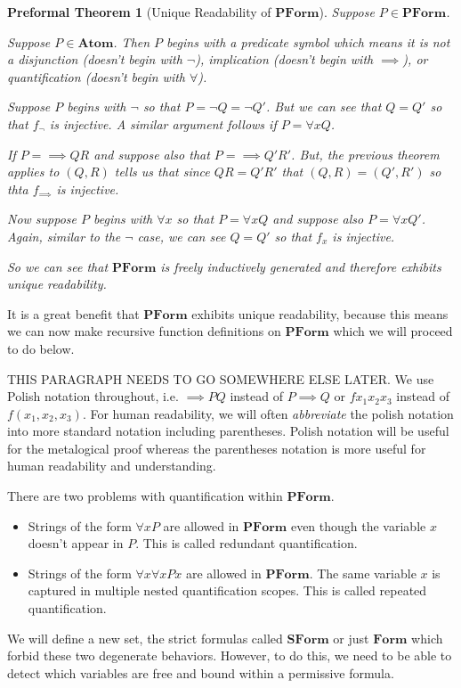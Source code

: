 \documentclass[oneside, 12pt]{book}
\theoremstyle{break}
\newtheorem{preformal definition}[definition]{Preformal Definition}
\newtheorem{preformal theorem}[theorem]{Preformal Theorem}
\begin{document}
		\begin{preformal theorem}[Unique Readability of $\textbf{PForm}$]
			Suppose $P\in \textbf{PForm}$.
			
			Suppose $P \in \textbf{Atom}$. Then $P$ begins with a predicate symbol which means it is not a disjunction (doesn't begin with $\lnot$), implication (doesn't begin with $\implies$), or quantification (doesn't begin with $\forall$).
			
			Suppose $P$ begins with $\lnot$ so that $P = \lnot Q = \lnot Q'$. 
			But we can see that $Q=Q'$ so that $f_{\lnot}$ is injective.
			A similar argument follows if $P = \forall x Q$.
			
			If $P = \implies QR$ and suppose also that $P = \implies Q'R'$.
			But, the previous theorem applies to $(Q, R)$ tells us that since $QR = Q'R'$ that $(Q, R) = (Q', R')$ so thta $f_{\implies}$ is injective.
			
			Now suppose $P$ begins with $\forall x$ so that $P = \forall x Q$ and suppose also $P = \forall x Q'$.
			Again, similar to the $\lnot$ case, we can see $Q = Q'$ so that $f_x$ is injective.
			
			So we can see that $\textbf{PForm}$ is freely inductively generated and therefore exhibits unique readability.
		\end{preformal theorem}
		
		It is a great benefit that $\textbf{PForm}$ exhibits unique readability, because this means we can now make recursive function definitions on $\textbf{PForm}$ which we will proceed to do below.		
		
		THIS PARAGRAPH NEEDS TO GO SOMEWHERE ELSE LATER.
		We use Polish notation throughout, i.e. $\implies PQ$ instead of $P \implies Q$ or $fx_1 x_2 x_3$ instead of $f(x_1, x_2, x_3)$.
		For human readability, we will often \textit{abbreviate} the polish notation into more standard notation including parentheses.
		Polish notation will be useful for the metalogical proof whereas the parentheses notation is more useful for human readability and understanding.
	
		There are two problems with quantification within $\textbf{PForm}$.
		\begin{itemize}
			\item{Strings of the form $\forall x P$ are allowed in $\textbf{PForm}$ even though the variable $x$ doesn't appear in $P$. This is called redundant quantification.}
			\item{Strings of the form $\forall x \forall x Px$ are allowed in $\textbf{PForm}$. The same variable $x$ is captured in multiple nested quantification scopes. This is called repeated quantification.}
		\end{itemize}
		We will define a new set, the strict formulas called $\textbf{SForm}$ or just $\textbf{Form}$ which forbid these two degenerate behaviors.
		However, to do this, we need to be able to detect which variables are free and bound within a permissive formula.
		
\end{document}
